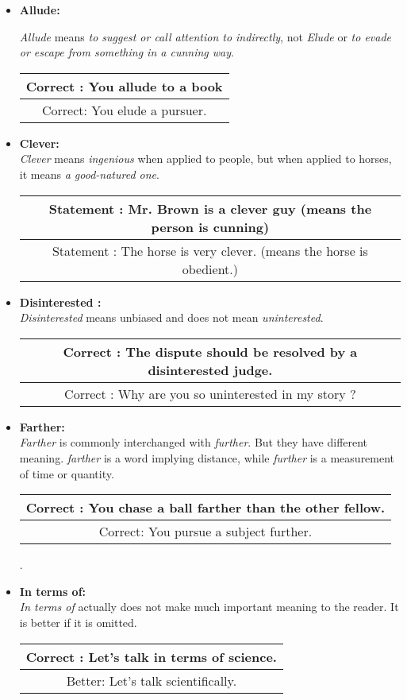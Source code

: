 \documentclass{report}
\newcommand{\DoubleRowSingleCol}[2]{
    \begin{center}
    \begin{tabular}{|c|}
     \hline
     #1\\\hline
     #2\\\hline
    \end{tabular}
    \end{center}
}
\begin{document}
\begin{itemize}
    \item
    \textbf{\Large{Allude:}}
    
    \textit{Allude} means \textit{to suggest or call attention to indirectly}, not \textit{Elude} or \textit{to evade or escape from something in a cunning way}.
    \DoubleRowSingleCol
    {Correct : You allude to a book}
    {Correct: You elude a pursuer.}
    
    \bigskip
    
    \item
    \textbf{\Large{Clever:}}\\
    \textit{Clever} means \textit{ingenious} when applied to people, but when applied to horses, it means \textit{a good-natured one}.
    
    \DoubleRowSingleCol
    {Statement : Mr. Brown is a clever guy (means the person is cunning)}
    {Statement : The horse is very clever. (means the horse is obedient.)}
    \bigskip

    \item
    \textbf{\Large{Disinterested :}}\\
    \textit{Disinterested} means unbiased and does not mean \textit{uninterested}.
    
    \DoubleRowSingleCol
    {Correct : The dispute should be resolved by a disinterested judge.}
    {Correct : Why are you so uninterested in my story ?}
     
    \newpage
    
    \item
    \textbf{\Large{Farther:}}\\
    
    \textit{Farther} is commonly interchanged with \textit{further}. But they have different meaning. \textit{farther} is a word implying distance, while \textit{further} is a measurement of time or quantity.
    
    \DoubleRowSingleCol
    {Correct : You chase a ball farther than the other fellow.}
    {Correct: You pursue a subject further.}
        .
    \item
    \textbf{\Large{In terms of:}}\\
    
    \textit{In terms of} actually does not make much important meaning to the reader. It is better if it is omitted.
    \DoubleRowSingleCol
    {Correct : Let's talk in terms of science.}
    {Better: Let's talk scientifically.}
    \bigskip


\end{itemize}
\end{document}

